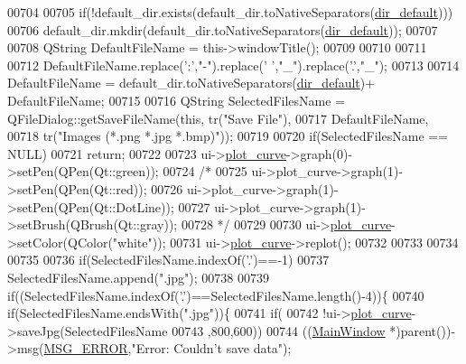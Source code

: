 \begin{DoxyCode}
{00704 
00705     \textcolor{keywordflow}{if}(!default\_dir.exists(default\_dir.toNativeSeparators(\hyperlink{a00004_aa55b7d8008e31fcc971692b493e7cf34}{dir\_default})))
00706         default\_dir.mkdir(default\_dir.toNativeSeparators(\hyperlink{a00004_aa55b7d8008e31fcc971692b493e7cf34}{dir\_default}));
00707 
00708     QString DefaultFileName = this->windowTitle();
00709 
00710 
00711 
00712     DefaultFileName.replace(\textcolor{charliteral}{':'},\textcolor{stringliteral}{"-"}).replace(\textcolor{charliteral}{' '},\textcolor{stringliteral}{"\_"}).replace(\textcolor{charliteral}{'.'},\textcolor{stringliteral}{"\_"});
00713 
00714     DefaultFileName = default\_dir.toNativeSeparators(\hyperlink{a00004_aa55b7d8008e31fcc971692b493e7cf34}{dir\_default})+ DefaultFileName;
00715 
00716     QString SelectedFilesName = QFileDialog::getSaveFileName(\textcolor{keyword}{this}, tr(\textcolor{stringliteral}{"Save File"}),
00717                                                         DefaultFileName,
00718                                                          tr(\textcolor{stringliteral}{"Images (*.png *.jpg *.bmp)"}));
00719 
00720     \textcolor{keywordflow}{if}(SelectedFilesName == NULL)
00721         \textcolor{keywordflow}{return};
00722 
00723     ui->\hyperlink{a00026_a1d46308dee8db7e3c99af65f13055479}{plot\_curve}->graph(0)->setPen(QPen(Qt::green));
00724     \textcolor{comment}{/*}
00725 \textcolor{comment}{    ui->plot\_curve->graph(1)->setPen(QPen(Qt::red));}
00726 \textcolor{comment}{    ui->plot\_curve->graph(1)->setPen(QPen(Qt::DotLine));}
00727 \textcolor{comment}{    ui->plot\_curve->graph(1)->setBrush(QBrush(Qt::gray));}
00728 \textcolor{comment}{    */}
00729 
00730     ui->\hyperlink{a00026_a1d46308dee8db7e3c99af65f13055479}{plot\_curve}->setColor(QColor(\textcolor{stringliteral}{"white"}));
00731     ui->\hyperlink{a00026_a1d46308dee8db7e3c99af65f13055479}{plot\_curve}->replot();
00732 
00733 
00734 
00735 
00736     \textcolor{keywordflow}{if}(SelectedFilesName.indexOf(\textcolor{charliteral}{'.'})==-1)
00737         SelectedFilesName.append(\textcolor{stringliteral}{".jpg"});
00738 
00739     \textcolor{keywordflow}{if}((SelectedFilesName.indexOf(\textcolor{charliteral}{'.'})==SelectedFilesName.length()-4))\{
00740     \textcolor{keywordflow}{if}(SelectedFilesName.endsWith(\textcolor{stringliteral}{".jpg"}))\{
00741        \textcolor{keywordflow}{if}(
00742         !ui->\hyperlink{a00026_a1d46308dee8db7e3c99af65f13055479}{plot\_curve}->saveJpg(SelectedFilesName
00743                                 ,800,600))
00744             ((\hyperlink{a00006}{MainWindow} *)parent())->msg(\hyperlink{a00034_aa8a990825a5a62c89d2fb8b08d8a1070}{MSG\_ERROR},\textcolor{stringliteral}{"Error: Couldn't save data"});
}
\end{DoxyCode}
